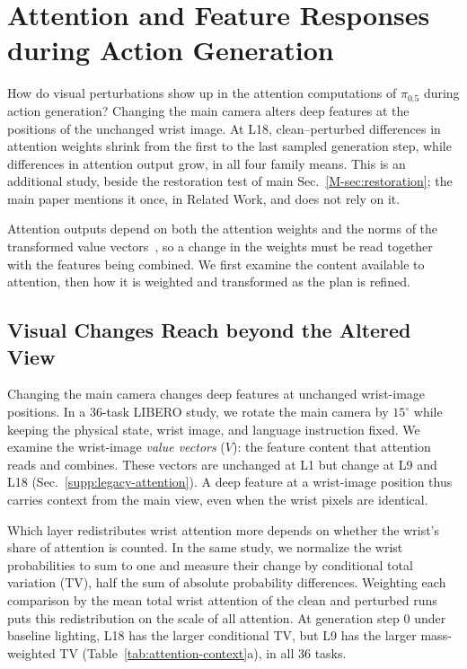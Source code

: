 \clearpage
\twocolumn
\section{Attention and Feature Responses during Action Generation}
\label{sec:supp-attention-analysis}
\label{sec:attention}
How do visual perturbations show up in the attention computations of $\pi_{0.5}$ during action generation? Changing the main camera alters deep features at the positions of the unchanged wrist image. At L18, clean--perturbed differences in attention weights shrink from the first to the last sampled generation step, while differences in attention output grow, in all four family means. This is an additional study, beside the restoration test of main Sec.~\ref{M-sec:restoration}; the main paper mentions it once, in Related Work, and does not rely on it.

Attention outputs depend on both the attention weights and the norms of the transformed value vectors~\cite{kobayashi2020}, so a change in the weights must be read together with the features being combined. We first examine the content available to attention, then how it is weighted and transformed as the plan is refined.

\subsection{Visual Changes Reach beyond the Altered View}
Changing the main camera changes deep features at unchanged wrist-image positions. In a 36-task LIBERO study, we rotate the main camera by $15^\circ$ while keeping the physical state, wrist image, and language instruction fixed. We examine the wrist-image \emph{value vectors} ($V$): the feature content that attention reads and combines. These vectors are unchanged at L1 but change at L9 and L18 (Sec.~\ref{supp:legacy-attention}). A deep feature at a wrist-image position thus carries context from the main view, even when the wrist pixels are identical.

Which layer redistributes wrist attention more depends on whether the wrist's share of attention is counted. In the same study, we normalize the wrist probabilities to sum to one and measure their change by conditional total variation (TV), half the sum of absolute probability differences. Weighting each comparison by the mean total wrist attention of the clean and perturbed runs puts this redistribution on the scale of all attention. At generation step 0 under baseline lighting, L18 has the larger conditional TV, but L9 has the larger mass-weighted TV (Table~\ref{tab:attention-context}a), in all 36 tasks.

